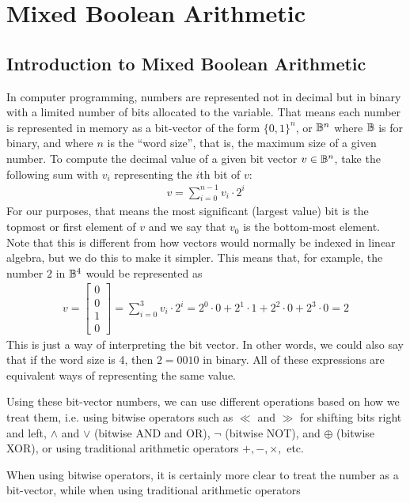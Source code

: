 \section{Mixed Boolean Arithmetic}
\subsection{Introduction to Mixed Boolean Arithmetic}
In computer programming, numbers are represented
not in decimal but in binary with a limited number of bits allocated to the
variable. That means each number is represented in memory as a bit-vector of
the form $\{0,1\}^n$, or $\mathbb{B}^n$ where $\mathbb{B}$ is for binary, and where $n$ is the ``word size'', that is, the maximum
size of a given number. To compute the decimal value of a given bit vector $v \in \mathbb{B}^n$,
take the following sum with $v_i$ representing the $i$th bit of $v$:
\begin{align*}
    v = \sum_{i = 0}^{n-1} v_i \cdot 2^{i}
\end{align*}
For our purposes, that means the most significant (largest value) bit is the topmost
or first element of $v$ and we say that $v_0$ is the bottom-most element. Note
that
this is different from how vectors would normally be indexed in linear algebra, but we
do this to make it simpler.
This means that, for example, the number $2$ in $\mathbb{B}^4$ would be represented as
\begin{align*}
    v = \begin{bmatrix}
        0 \\ 0 \\1 \\0
    \end{bmatrix} = \sum_{i=0}^{3}v_i \cdot 2^{i} = 2^0 \cdot 0 + 2^1 \cdot 1 + 2^2 \cdot 0 + 2^3 \cdot 0 = 2
\end{align*}
This is just a way of interpreting the bit vector. In other words, we could also say that
if the word size is 4, then $2 = 0010$ in binary. All of these expressions are
equivalent ways of representing the same value.
\par Using these bit-vector numbers, we can use different
operations based on how we treat them, i.e. using bitwise operators such as
$\ll$ and $\gg$ for shifting bits right and left, $\land$ and $\lor$ (bitwise AND and OR), $\neg$ (bitwise NOT),
and $\oplus$ (bitwise XOR), or using traditional arithmetic operators $+, -, \times,$ etc.
\par When using bitwise operators, it is certainly more clear to treat the
number as a bit-vector, while when using traditional arithmetic operators
